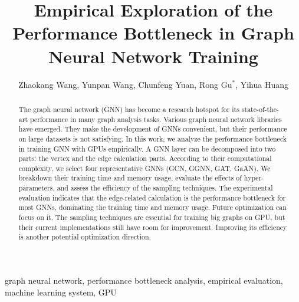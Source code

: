 \documentclass{elsarticle}
\begin{document}
\begin{frontmatter}

	\title{Empirical Exploration of the Performance Bottleneck in Graph Neural Network Training}
    \author{Zhaokang Wang, Yunpan Wang, Chunfeng Yuan, Rong Gu$^*$, Yihua Huang }
	\address{State Key Laboratory for Novel Software Technology, \\Department of Computer Science and Technology, Nanjing University, \\Nanjing 210023, China}

	\begin{abstract}
		The graph neural network (GNN) has become a research hotspot for its state-of-the-art performance in many graph analysis tasks.
		Various graph neural network libraries have emerged.
		They make the development of GNNs convenient, but their performance on large datasets is not satisfying.
		In this work, we analyze the performance bottleneck in training GNN with GPUs empirically.
		A GNN layer can be decomposed into two parts: the vertex and the edge calculation parts.
		According to their computational complexity, we select four representative GNNs (GCN, GGNN, GAT, GaAN).
		We breakdown their training time and memory usage, evaluate the effects of hyper-parameters, and assess the efficiency of the sampling techniques.  
		The experimental evaluation indicates that the edge-related calculation is the performance bottleneck for most GNNs, dominating the training time and memory usage.
		Future optimization can focus on it. 
		The sampling techniques are essential for training big graphs on GPU, but their current implementations still have room for improvement.
		Improving its efficiency is another potential optimization direction.
	\end{abstract}

	\begin{keyword}
		graph neural network, performance bottleneck analysis, empirical evaluation, machine learning system, GPU
	\end{keyword}

\end{frontmatter}

\linenumbers











\end{document}
